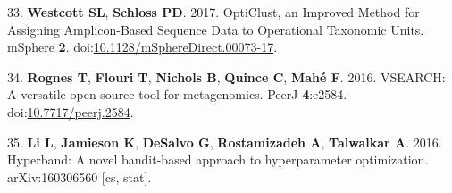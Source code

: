 \documentclass[11pt,]{article}
\begin{document}
\hypertarget{ref-westcott_opticlust_2017}{}
33. \textbf{Westcott SL}, \textbf{Schloss PD}. 2017. OptiClust, an
Improved Method for Assigning Amplicon-Based Sequence Data to
Operational Taxonomic Units. mSphere \textbf{2}.
doi:\href{https://doi.org/10.1128/mSphereDirect.00073-17}{10.1128/mSphereDirect.00073-17}.

\hypertarget{ref-rognes_vsearch_2016}{}
34. \textbf{Rognes T}, \textbf{Flouri T}, \textbf{Nichols B},
\textbf{Quince C}, \textbf{Mahé F}. 2016. VSEARCH: A versatile open
source tool for metagenomics. PeerJ \textbf{4}:e2584.
doi:\href{https://doi.org/10.7717/peerj.2584}{10.7717/peerj.2584}.

\hypertarget{ref-li_hyperband:_2016}{}
35. \textbf{Li L}, \textbf{Jamieson K}, \textbf{DeSalvo G},
\textbf{Rostamizadeh A}, \textbf{Talwalkar A}. 2016. Hyperband: A novel
bandit-based approach to hyperparameter optimization. arXiv:160306560
{[}cs, stat{]}.
\end{document}
